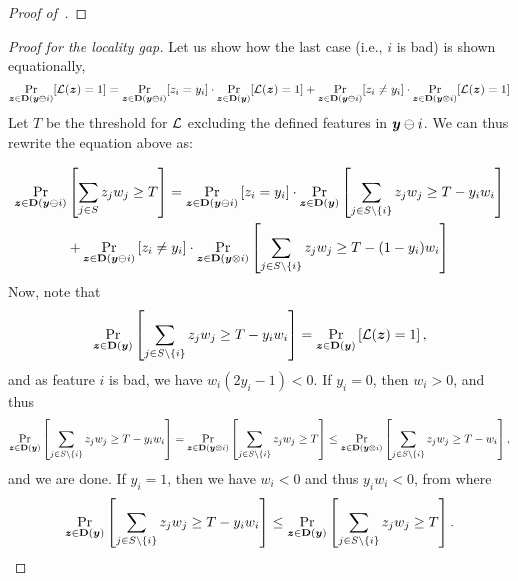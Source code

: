 \begin{proof}[Proof of~]
\end{proof}


\begin{proof}[Proof for the locality gap]
    Let us show how  the last case (i.e., $i$ is bad) is shown equationally,
    \[
        \Pr_{{\bm{z}} \in \mathbf{D}({\bm{y}} \ominus i)}[\mathcal{L}({\bm{z}}) = 1] = \Pr_{{\bm{z}} \in \mathbf{D}({\bm{y}}  \ominus i)}[z_i = y_i] \cdot \Pr_{{\bm{z}} \in \mathbf{D}({\bm{y}})}[\mathcal{L}({\bm{z}}) = 1] +   \Pr_{{\bm{z}} \in \mathbf{D}({\bm{y}}  \ominus i)}[z_i \neq y_i] \cdot \Pr_{{\bm{z}} \in \mathbf{D}({\bm{y}} \otimes i)}[\mathcal{L}({\bm{z}}) = 1]
    \]
    Let $T$ be the threshold for $\mathcal{L}$ excluding the defined features in ${\bm{y}} \ominus i$.
    We can thus rewrite the equation above as:
     
    \begin{multline*}
        \Pr_{{\bm{z}} \in \mathbf{D}({\bm{y}} \ominus i)}\left[\sum_{j\in S} z_j w_j \geq T\right] = \Pr_{{\bm{z}} \in \mathbf{D}({\bm{y}}  \ominus i)}\left[z_i = y_i\right] \cdot \Pr_{{\bm{z}} \in \mathbf{D}({\bm{y}})}\left[\sum_{j \in S \setminus \{i\}} z_j w_j \geq T- y_i w_i\right]
                                                         \\   +  \Pr_{{\bm{z}} \in \mathbf{D}({\bm{y}}  \ominus i)}\left[z_i \neq y_i\right] \cdot \Pr_{{\bm{z}} \in \mathbf{D}({\bm{y}} \otimes i)}\left[\sum_{j \in S \setminus \{i\}} z_j w_j \geq T - (1-y_i)w_i\right]
\end{multline*}
Now, note that 
\[
    \Pr_{{\bm{z}} \in \mathbf{D}({\bm{y}})}\left[\sum_{j \in S \setminus \{i\}} z_j w_j \geq T- y_i w_i\right] =   \Pr_{{\bm{z}} \in \mathbf{D}({\bm{y}})}\left[\mathcal{L}({\bm{z}}) = 1\right],
\]
and as feature $i$ is bad, we have $w_i(2y_i - 1) < 0$. If $y_i = 0$, then $w_i > 0$, and thus 
\[
    \Pr_{{\bm{z}} \in \mathbf{D}({\bm{y}})}\left[\sum_{j \in S \setminus \{i\}} z_j w_j \geq T- y_i w_i\right] = \Pr_{{\bm{z}} \in \mathbf{D}({\bm{y}} \otimes i)}\left[\sum_{j \in S \setminus \{i\}} z_j w_j \geq T\right] \leq \Pr_{{\bm{z}} \in \mathbf{D}({\bm{y}} \otimes i)}\left[\sum_{j \in S \setminus \{i\}} z_j w_j \geq T - w_i\right],
\]
and we are done. If $y_i = 1$, then we have $w_i < 0$ and thus $y_i w_i< 0$, from where  
\[
    \Pr_{{\bm{z}} \in \mathbf{D}({\bm{y}})}\left[\sum_{j \in S \setminus \{i\}} z_j w_j \geq T- y_i w_i\right] \leq \Pr_{{\bm{z}} \in \mathbf{D}({\bm{y}})}\left[\sum_{j \in S \setminus \{i\}} z_j w_j \geq T\right].
\]
    

\end{proof}